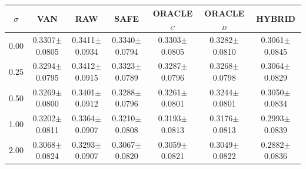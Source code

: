 \begin{tabular}{ccccccc}
\toprule
$\sigma$ & VAN & RAW & SAFE & ORACLE$_C$ & ORACLE$_D$ & HYBRID \\
\midrule
0.00 & 0.3307$\pm$0.0805 & 0.3411$\pm$0.0934 & 0.3340$\pm$0.0794 & 0.3303$\pm$0.0805 & 0.3282$\pm$0.0810 & 0.3061$\pm$0.0845 \\
0.25 & 0.3294$\pm$0.0795 & 0.3412$\pm$0.0915 & 0.3323$\pm$0.0789 & 0.3287$\pm$0.0796 & 0.3268$\pm$0.0798 & 0.3064$\pm$0.0829 \\
0.50 & 0.3269$\pm$0.0800 & 0.3401$\pm$0.0912 & 0.3288$\pm$0.0796 & 0.3261$\pm$0.0801 & 0.3244$\pm$0.0801 & 0.3050$\pm$0.0834 \\
1.00 & 0.3202$\pm$0.0811 & 0.3364$\pm$0.0907 & 0.3210$\pm$0.0808 & 0.3193$\pm$0.0813 & 0.3176$\pm$0.0813 & 0.2993$\pm$0.0839 \\
2.00 & 0.3068$\pm$0.0824 & 0.3293$\pm$0.0907 & 0.3067$\pm$0.0820 & 0.3059$\pm$0.0821 & 0.3049$\pm$0.0822 & 0.2882$\pm$0.0836 \\
\bottomrule
\end{tabular}
